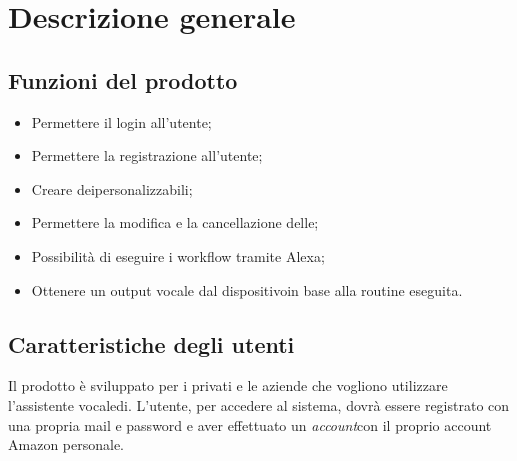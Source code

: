 \chapter{Descrizione generale}

\section{Funzioni del prodotto}
\begin{itemize}
	\item Permettere il login all'utente;
	\item Permettere la registrazione all'utente;
	\item Creare deipersonalizzabili;
	\item Permettere la modifica e la cancellazione delle;
	\item Possibilità di eseguire i workflow tramite Alexa;
	\item Ottenere un output vocale dal dispositivoin base alla routine eseguita.
\end{itemize}

\section{Caratteristiche degli utenti}
Il prodotto è sviluppato per i privati e le aziende che vogliono utilizzare l'assistente vocaledi.
L'utente, per accedere al sistema, dovrà essere registrato con una propria mail e password e aver effettuato un \textit{account}con il proprio account Amazon personale.
